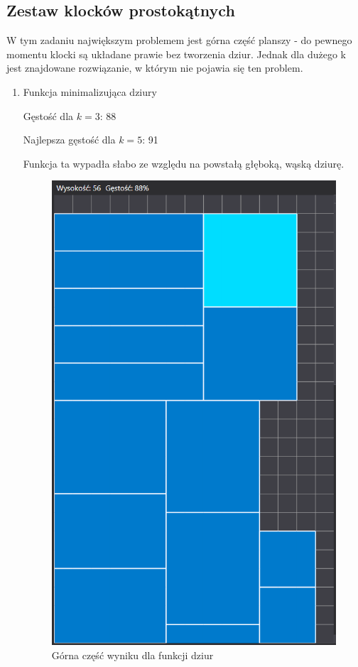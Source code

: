\documentclass{article}
\begin{document}
\subsection{Zestaw klocków prostokątnych}
W tym zadaniu największym problemem jest górna część planszy - do pewnego momentu klocki są układane prawie bez tworzenia dziur. Jednak dla dużego k jest znajdowane rozwiązanie, w którym nie pojawia się ten problem.
\begin{enumerate}

\item Funkcja minimalizująca dziury

Gęstość dla $k=3$: 88

Najlepsza gęstość dla $k=5$: 91

Funkcja ta wypadła słabo ze względu na powstałą głęboką, wąską dziurę.
\begin{figure}[H]
\includegraphics[width=\textwidth]{prostokaty_dziury.PNG}
\caption{Górna część wyniku dla funkcji dziur}
\end{figure}



\end{enumerate}
\end{document}
